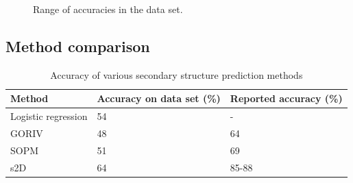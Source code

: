 \documentclass{article}
\begin{document}
\begin{figure}[h]
  \centering
  \caption{Range of accuracies in the data set. }
\end{figure}

\subsection{Method comparison}


\begin{table}[t]
  \caption{Accuracy of various secondary structure prediction methods}
  \centering
  \begin{tabular}{lll}
    \toprule
    Method     & Accuracy on data set (\%)    & Reported accuracy (\%)\\
    \midrule
    Logistic regression & 54 & -     \\
    GORIV     & 48 & 64      \\
    SOPM     & 51      & 69  \\
    s2D     & 64       & 85-88  \\
    \bottomrule
  \end{tabular}
\end{table}
\end{document}
